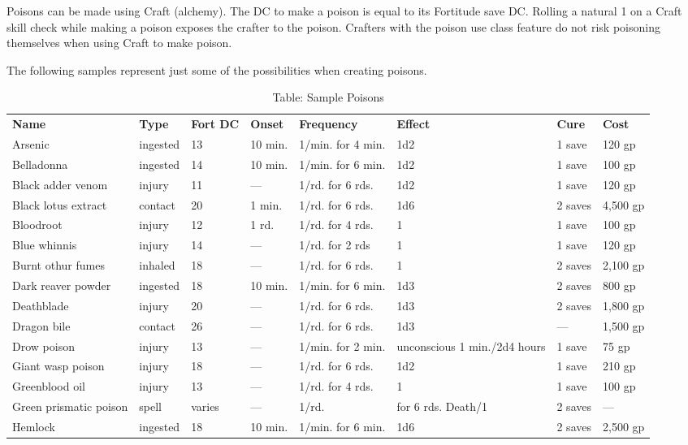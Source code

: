 Poisons can be made using Craft (alchemy). The DC to make a poison is equal to its Fortitude save DC. Rolling a natural 1 on a Craft skill check while making a poison exposes the crafter to the poison. Crafters with the poison use class feature do not risk poisoning themselves when using Craft to make poison.
				
The following samples represent just some of the possibilities when creating poisons.
				

\begin{table}[]
\sffamily
\caption{Table: Sample Poisons}
\begin{tabular}{llllllll}
\textbf{Name} & \textbf{Type} & \textbf{Fort DC} & \textbf{Onset} & \textbf{Frequency} & \textbf{Effect} & \textbf{Cure} & \textbf{Cost}\\
Arsenic & ingested & 13 & 10 min. & 1/min. for 4 min. & 1d2  & 1 save & 120 gp\\
Belladonna & ingested & 14 & 10 min. & 1/min. for 6 min. & 1d2  & 1 save & 100 gp\\
Black adder venom & injury & 11 & — & 1/rd. for 6 rds. & 1d2  & 1 save & 120 gp\\
Black lotus extract & contact & 20 & 1 min. & 1/rd. for 6 rds. & 1d6  & 2 saves & 4,500 gp\\
Bloodroot & injury & 12 & 1 rd. & 1/rd. for 4 rds. & 1  & 1 save & 100 gp\\
Blue whinnis & injury & 14 & — & 1/rd. for 2 rds &  1  & 1 save & 120 gp\\
Burnt othur fumes & inhaled & 18 & — & 1/rd. for 6 rds. & 1  & 2 saves & 2,100 gp\\
Dark reaver powder & ingested & 18 & 10 min. & 1/min. for 6 min. & 1d3  & 2 saves & 800 gp\\
Deathblade & injury & 20 & — & 1/rd. for 6 rds. & 1d3  & 2 saves & 1,800 gp\\
Dragon bile & contact & 26 & — & 1/rd. for 6 rds. & 1d3  & — & 1,500 gp\\
Drow poison & injury & 13 & — & 1/min. for 2 min. & unconscious 1 min./2d4 hours & 1 save & 75 gp\\
Giant wasp poison & injury & 18 & — & 1/rd. for 6 rds. & 1d2  & 1 save & 210 gp\\
Greenblood oil & injury & 13 & — & 1/rd. for 4 rds. & 1  & 1 save & 100 gp\\
Green prismatic poison & spell & varies & — & 1/rd. & for 6 rds. Death/1  & 2 saves & —\\
Hemlock & ingested & 18 & 10 min. & 1/min. for 6 min. & 1d6  & 2 saves & 2,500 gp\\

\end{tabular}
\end{table}
